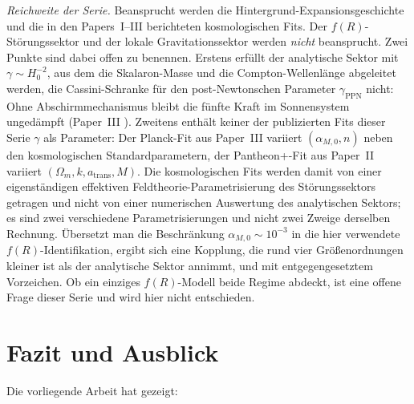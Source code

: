 \documentclass[aps,prd,twocolumn,superscriptaddress,nofootinbib]{revtex4-2}
\begin{document}
\textit{Reichweite der Serie.} Beansprucht werden die Hintergrund-Expansionsgeschichte und die in den Papers~I--III berichteten kosmologischen Fits. Der $f(R)$-Störungssektor und der lokale Gravitationssektor werden \textit{nicht} beansprucht. Zwei Punkte sind dabei offen zu benennen. Erstens erfüllt der analytische Sektor mit $\gamma \sim H_0^{-2}$, aus dem die Skalaron-Masse und die Compton-Wellenlänge abgeleitet werden, die Cassini-Schranke für den post-Newtonschen Parameter $\gamma_{\mathrm{PPN}}$ nicht: Ohne Abschirmmechanismus bleibt die fünfte Kraft im Sonnensystem ungedämpft (Paper~III \cite{Geiger2026c}). Zweitens enthält keiner der publizierten Fits dieser Serie $\gamma$ als Parameter: Der Planck-Fit aus Paper~III variiert $(\alpha_{M,0}, n)$ neben den kosmologischen Standardparametern, der Pantheon+-Fit aus Paper~II variiert $(\Omega_m, k, a_{\mathrm{trans}}, M)$. Die kosmologischen Fits werden damit von einer eigenständigen effektiven Feldtheorie-Parametrisierung des Störungssektors getragen und nicht von einer numerischen Auswertung des analytischen Sektors; es sind zwei verschiedene Parametrisierungen und nicht zwei Zweige derselben Rechnung. Übersetzt man die Beschränkung $\alpha_{M,0} \sim 10^{-3}$ in die hier verwendete $f(R)$-Identifikation, ergibt sich eine Kopplung, die rund vier Größenordnungen kleiner ist als der analytische Sektor annimmt, und mit entgegengesetztem Vorzeichen. Ob ein einziges $f(R)$-Modell beide Regime abdeckt, ist eine offene Frage dieser Serie und wird hier nicht entschieden.

\section{Fazit und Ausblick}
\label{sec:conclusion}

Die vorliegende Arbeit hat gezeigt:
\end{document}
